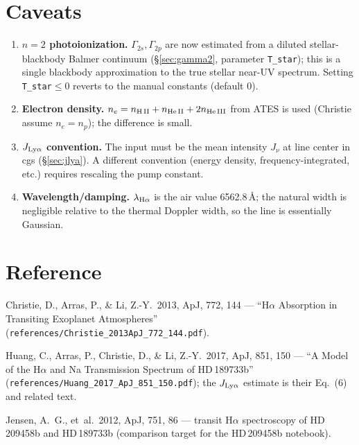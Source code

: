 \documentclass[english,a4paper]{kiseon_memo}
\begin{document}
\section{Caveats}

\begin{enumerate}
  \item \textbf{$n=2$ photoionization.} $\Gamma_{2s},\Gamma_{2p}$ are now
    estimated from a diluted stellar-blackbody Balmer continuum
    (\S\ref{sec:gamma2}, parameter \texttt{T\_star}); this is a single
    blackbody approximation to the true stellar near-UV spectrum. Setting
    \texttt{T\_star}$\le0$ reverts to the manual constants (default $0$).
  \item \textbf{Electron density.} $n_e=n_{\rm H\,II}+n_{\rm He\,II}
    +2n_{\rm He\,III}$ from ATES is used (Christie assume $n_e=n_p$); the
    difference is small.
  \item \textbf{$J_{\rm Ly\alpha}$ convention.} The input must be the
    mean intensity $J_\nu$ at line center in cgs (\S\ref{sec:jlya}). A
    different convention (energy density, frequency-integrated, etc.)
    requires rescaling the pump constant.
  \item \textbf{Wavelength/damping.} $\lambda_{\rm H\alpha}$ is the air
    value 6562.8\,\AA{}; the natural width is negligible relative to the
    thermal Doppler width, so the line is essentially Gaussian.
\end{enumerate}

\section*{Reference}
\noindent Christie, D., Arras, P., \& Li, Z.-Y.\ 2013, ApJ, 772, 144 ---
``H$\alpha$ Absorption in Transiting Exoplanet Atmospheres''
(\texttt{references/Christie\_2013ApJ\_772\_144.pdf}).

\medskip
\noindent Huang, C., Arras, P., Christie, D., \& Li, Z.-Y.\ 2017, ApJ,
851, 150 --- ``A Model of the H$\alpha$ and Na Transmission Spectrum of
HD\,189733b'' (\texttt{references/Huang\_2017\_ApJ\_851\_150.pdf});
the $J_{\rm Ly\alpha}$ estimate is their Eq.~(6) and related text.

\medskip
\noindent Jensen, A.~G., et~al.\ 2012, ApJ, 751, 86 --- transit H$\alpha$
spectroscopy of HD\,209458b and HD\,189733b (comparison target for the
HD\,209458b notebook).
\end{document}
